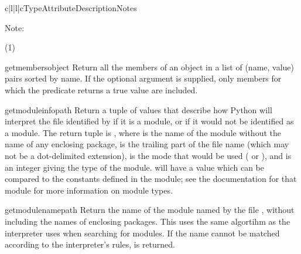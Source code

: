 \begin{tableiv}{c|l|l|c}{}{Type}{Attribute}{Description}{Notes}
  \hline
\end{tableiv}

\noindent
Note:
\begin{description}
\item[(1)]
\end{description}


\begin{funcdesc}{getmembers}{object}
  Return all the members of an object in a list of (name, value) pairs
  sorted by name.  If the optional  argument is supplied,
  only members for which the predicate returns a true value are included.
\end{funcdesc}

\begin{funcdesc}{getmoduleinfo}{path}
  Return a tuple of values that describe how Python will interpret the
  file identified by  if it is a module, or  if
  it would not be identified as a module.  The return tuple is
  , where
   is the name of the module without the name of any
  enclosing package,  is the trailing part of the file
  name (which may not be a dot-delimited extension),  is the
   mode that would be used ( or
  ), and  is an integer giving the type of the
  module.   will have a value which can be compared to the
  constants defined in the  module; see the
  documentation for that module for more information on module types.
\end{funcdesc}

\begin{funcdesc}{getmodulename}{path}
  Return the name of the module named by the file , without
  including the names of enclosing packages.  This uses the same
  algortihm as the interpreter uses when searching for modules.  If
  the name cannot be matched according to the interpreter's rules,
   is returned.
\end{funcdesc}

